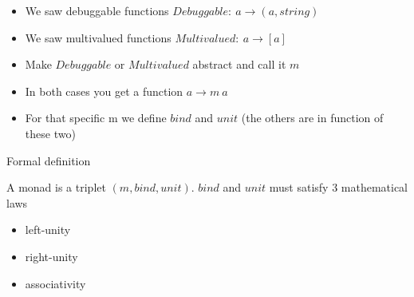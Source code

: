 \begin{frame}[fragile]{}
    \begin{block}{}
        \begin{itemize}
            \item We saw debuggable functions $Debuggable: \: a \rightarrow (a, string)$
            \item We saw multivalued functions $Multivalued: \: a \rightarrow [a]$
            \item Make $Debuggable$ or $Multivalued$ abstract and call it $m$
            \item In both cases you get a function $a \rightarrow m \: a$
            \item For that specific m we define $bind$ and $unit$ (the others are in function of these two)
        \end{itemize}
    \end{block}
\end{frame}

\begin{frame}[fragile]{Formal definition}
    \begin{block}{}
        A monad is a triplet $(m, bind, unit)$. $bind$ and $unit$ must satisfy 3 mathematical laws
        \begin{itemize}
            \item left-unity
            \item right-unity
            \item associativity
        \end{itemize}
    \end{block}
\end{frame}

